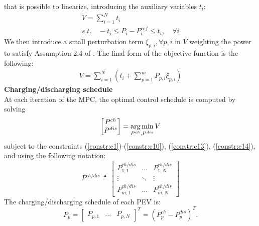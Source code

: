 that is possible to linearize, introducing the auxiliary variables $t_i$:
\begin{gather}
    V = \sum_{i=1}^{N} t_i \\
    s.t. \quad -t_i \leq P_i - P^{ref}_i \leq t_i, \quad \forall i \label{constr:c13}
\end{gather}
We then introduce a small perturbation term $\xi_{p,i}, \forall p,i$ in $V$ weighting the power to satisfy Assumption 2.4 of \autocite{VUJANIC2016144}. The final form of the objective function is the following:
\begin{align}
    V = \sum_{i=1}^{N} (t_i + \sum_{p=1}^m P_{p,i} \xi_{p,i}) \label{constr:c14}
\end{align}
\textbf{Charging/discharging schedule} \\
At each iteration of the MPC, the optimal control schedule is computed by solving
\begin{align}
    \begin{bmatrix}
        P^{ch}\\
        P^{dis} 
    \end{bmatrix}
    = \operatorname*{arg\,min}_{P^{ch}, P^{dis}} V
\end{align}
subject to the constraints (\ref{constr:c1})-(\ref{constr:c10}), (\ref{constr:c13}), (\ref{constr:c14}),
\\and using the following notation:
$$P^{ch/dis} \triangleq \begin{bmatrix} 
    P^{ch/dis}_{1,1} & \dots & P^{ch/dis}_{1, N} \\
    \vdots & \ddots & \vdots \\
    P^{ch/dis}_{m,1} & \dots & P^{ch/dis}_{m, N}
\end{bmatrix}$$ 
The charging/discharging schedule of each PEV is:
$$P_p = \begin{bmatrix} P_{p,1} & \dots & P_{p, N} \end{bmatrix}^T = (P^{ch}_{p}-P^{dis}_{p})^T.$$